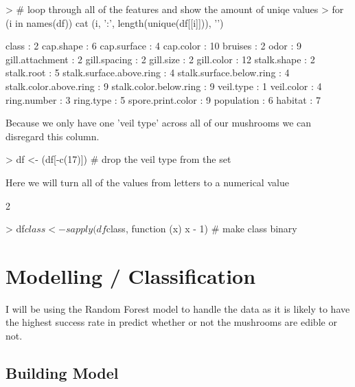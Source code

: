 \documentclass[10pt]{article}         %
\begin{document}
\begin{Schunk}
\begin{Sinput}
> # loop through all of the features and show the amount of uniqe values
> for (i in names(df)) { cat (i, ':', length(unique(df[[i]])), '\n')}
\end{Sinput}
\begin{Soutput}
class : 2 
cap.shape : 6 
cap.surface : 4 
cap.color : 10 
bruises : 2 
odor : 9 
gill.attachment : 2 
gill.spacing : 2 
gill.size : 2 
gill.color : 12 
stalk.shape : 2 
stalk.root : 5 
stalk.surface.above.ring : 4 
stalk.surface.below.ring : 4 
stalk.color.above.ring : 9 
stalk.color.below.ring : 9 
veil.type : 1 
veil.color : 4 
ring.number : 3 
ring.type : 5 
spore.print.color : 9 
population : 6 
habitat : 7 
\end{Soutput}
\end{Schunk}
Because we only have one 'veil type' across all of our mushrooms we can disregard this column.
\begin{Schunk}
\begin{Sinput}
> df <- (df[-c(17)]) # drop the veil type from the set
\end{Sinput}
\end{Schunk}

Here we will turn all of the values from letters to a numerical value
\begin{Schunk}
\begin{Soutput}
[1] 2
\end{Soutput}
\begin{Sinput}
> df$class <- sapply(df$class, function (x) x - 1) # make class binary
\end{Sinput}
\end{Schunk}


\section{Modelling / Classification}
I will be using the Random Forest model to handle the data as it is likely to have the highest success rate in predict whether or not the mushrooms are edible or not.

\subsection{Building Model}
\end{document}
